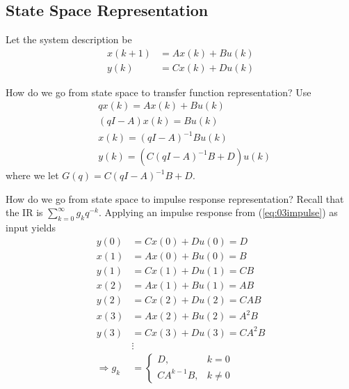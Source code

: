 \subsection{State Space Representation}
Let the system description be
\begin{align*}
x(k+1) &= Ax(k) + Bu(k) \\
y(k) &= Cx(k) + Du(k)
\end{align*}

How do we go from state space to transfer function representation? Use
\begin{align*}
&qx(k) = Ax(k) + Bu(k) \\
&(qI-A)x(k) = Bu(k) \\
&x(k) = (qI-A)^{-1}Bu(k) \\
&y(k) = (C(qI-A)^{-1}B+D)u(k)
\end{align*}
where we let $G(q) = C(qI-A)^{-1}B+D$.

How do we go from state space to impulse response representation? Recall that the IR is $\sum_{k=0}^\infty g_kq^{-k}$. Applying an impulse response from (\ref{eq:03impulse}) as input yields
\begin{align*}
y(0) &= Cx(0) + Du(0) = D \\
x(1) &= Ax(0) + Bu(0) = B \\
y(1) &= Cx(1) + Du(1) = CB \\
x(2) &= Ax(1) + Bu(1) = AB \\
y(2) &= Cx(2) + Du(2) = CAB \\
x(3) &= Ax(2) + Bu(2) = A^2B \\
y(3) &= Cx(3) + Du(3) = CA^2B \\
&\vdots \\
\Rightarrow g_k &= \begin{cases} D, & k=0 \\ CA^{k-1}B, & k\neq 0 \end{cases}
\end{align*}

